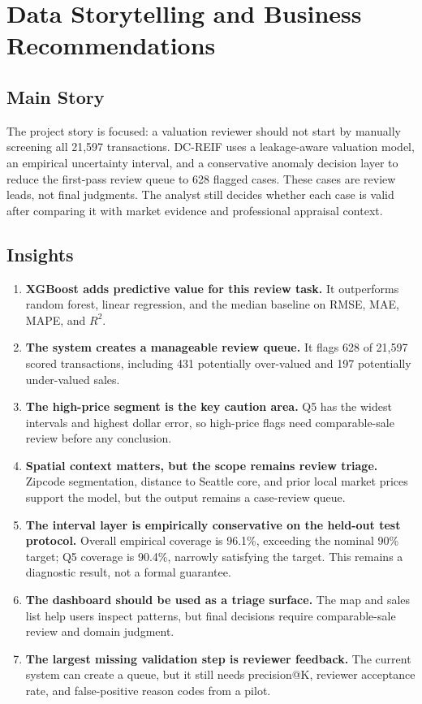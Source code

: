 \documentclass[12pt,a4paper]{article}
\begin{document}
\section{Data Storytelling and Business Recommendations}

\subsection{Main Story}
The project story is focused: a valuation reviewer should not start by manually screening all 21,597 transactions. DC-REIF uses a leakage-aware valuation model, an empirical uncertainty interval, and a conservative anomaly decision layer to reduce the first-pass review queue to 628 flagged cases. These cases are review leads, not final judgments. The analyst still decides whether each case is valid after comparing it with market evidence and professional appraisal context.

\subsection{Insights}
\begin{enumerate}
    \item \textbf{XGBoost adds predictive value for this review task.} It outperforms random forest, linear regression, and the median baseline on RMSE, MAE, MAPE, and $R^2$.
    \item \textbf{The system creates a manageable review queue.} It flags 628 of 21,597 scored transactions, including 431 potentially over-valued and 197 potentially under-valued sales.
    \item \textbf{The high-price segment is the key caution area.} Q5 has the widest intervals and highest dollar error, so high-price flags need comparable-sale review before any conclusion.
    \item \textbf{Spatial context matters, but the scope remains review triage.} Zipcode segmentation, distance to Seattle core, and prior local market prices support the model, but the output remains a case-review queue.
    \item \textbf{The interval layer is empirically conservative on the held-out test protocol.} Overall empirical coverage is 96.1\%, exceeding the nominal 90\% target; Q5 coverage is 90.4\%, narrowly satisfying the target. This remains a diagnostic result, not a formal guarantee.
    \item \textbf{The dashboard should be used as a triage surface.} The map and sales list help users inspect patterns, but final decisions require comparable-sale review and domain judgment.
    \item \textbf{The largest missing validation step is reviewer feedback.} The current system can create a queue, but it still needs precision@K, reviewer acceptance rate, and false-positive reason codes from a pilot.
\end{enumerate}
\end{document}
